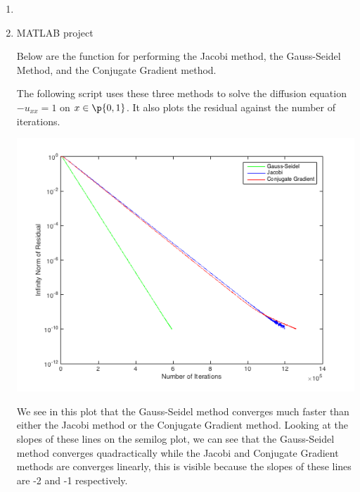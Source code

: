 \documentclass[11pt]{article}
\begin{document}
\begin{enumerate}
    \item %
        

    \item %
        MATLAB project

        Below are the function for performing the 
        Jacobi method, the Gauss-Seidel Method, and the Conjugate Gradient
        method.
        
        
        

        The following script uses these three methods to solve the diffusion
        equation $-u_{xx} = 1$ on $x \in \p{0, 1}$.
        It also plots the residual against the number of iterations.
        
        \begin{center}
            \includegraphics[scale=.7]{Figures/05_10_1.png}
        \end{center}

        We see in this plot that the Gauss-Seidel method converges much faster
        than either the Jacobi method or the Conjugate Gradient method.
        Looking at the slopes of these lines on the semilog plot, we can see that
        the Gauss-Seidel method converges quadractically while the Jacobi and
        Conjugate Gradient methods are converges linearly, this is visible because
        the slopes of these lines are -2 and -1 respectively.
\end{enumerate}
\end{document}
